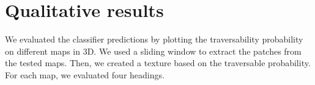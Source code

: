 \documentclass[../document.tex]{subfiles}
\begin{document}
\section{Qualitative results}
We evaluated the classifier predictions by plotting the traversability probability on different maps in 3D. We used a sliding window to extract the patches from the tested maps. Then, we created a texture based on the traversable probability. For each map, we evaluated four headings.
\end{document}
